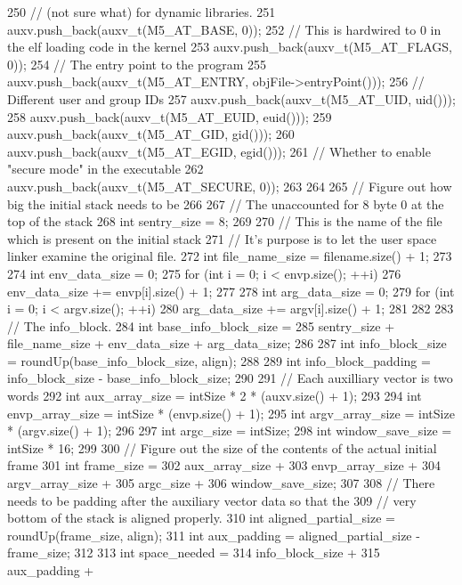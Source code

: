 \begin{DoxyCode}
{{250         // (not sure what) for dynamic libraries.
251         auxv.push_back(auxv_t(M5_AT_BASE, 0));
252         // This is hardwired to 0 in the elf loading code in the kernel
253         auxv.push_back(auxv_t(M5_AT_FLAGS, 0));
254         // The entry point to the program
255         auxv.push_back(auxv_t(M5_AT_ENTRY, objFile->entryPoint()));
256         // Different user and group IDs
257         auxv.push_back(auxv_t(M5_AT_UID, uid()));
258         auxv.push_back(auxv_t(M5_AT_EUID, euid()));
259         auxv.push_back(auxv_t(M5_AT_GID, gid()));
260         auxv.push_back(auxv_t(M5_AT_EGID, egid()));
261         // Whether to enable "secure mode" in the executable
262         auxv.push_back(auxv_t(M5_AT_SECURE, 0));
263     }
264 
265     // Figure out how big the initial stack needs to be
266 
267     // The unaccounted for 8 byte 0 at the top of the stack
268     int sentry_size = 8;
269 
270     // This is the name of the file which is present on the initial stack
271     // It's purpose is to let the user space linker examine the original file.
272     int file_name_size = filename.size() + 1;
273 
274     int env_data_size = 0;
275     for (int i = 0; i < envp.size(); ++i) {
276         env_data_size += envp[i].size() + 1;
277     }
278     int arg_data_size = 0;
279     for (int i = 0; i < argv.size(); ++i) {
280         arg_data_size += argv[i].size() + 1;
281     }
282 
283     // The info_block.
284     int base_info_block_size =
285         sentry_size + file_name_size + env_data_size + arg_data_size;
286 
287     int info_block_size = roundUp(base_info_block_size, align);
288 
289     int info_block_padding = info_block_size - base_info_block_size;
290 
291     // Each auxilliary vector is two words
292     int aux_array_size = intSize * 2 * (auxv.size() + 1);
293 
294     int envp_array_size = intSize * (envp.size() + 1);
295     int argv_array_size = intSize * (argv.size() + 1);
296 
297     int argc_size = intSize;
298     int window_save_size = intSize * 16;
299 
300     // Figure out the size of the contents of the actual initial frame
301     int frame_size =
302         aux_array_size +
303         envp_array_size +
304         argv_array_size +
305         argc_size +
306         window_save_size;
307 
308     // There needs to be padding after the auxiliary vector data so that the
309     // very bottom of the stack is aligned properly.
310     int aligned_partial_size = roundUp(frame_size, align);
311     int aux_padding = aligned_partial_size - frame_size;
312 
313     int space_needed =
314         info_block_size +
315         aux_padding +
}
\end{DoxyCode}
